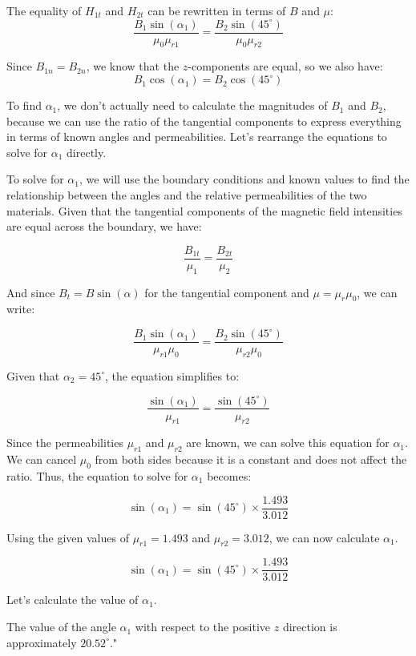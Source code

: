 The equality of \(H_{1t}\) and \(H_{2t}\) can be rewritten in terms of \(B\) and \(\mu\):
\[\frac{B_{1} \sin(\alpha_{1})}{\mu_{0}\mu_{r1}} = \frac{B_{2} \sin(45^\circ)}{\mu_{0}\mu_{r2}}\]

Since \(B_{1n} = B_{2n}\), we know that the \(z\)-components are equal, so we also have:
\[B_{1} \cos(\alpha_{1}) = B_{2} \cos(45^\circ)\]

To find \(\alpha_{1}\), we don't actually need to calculate the magnitudes of \(B_1\) and \(B_2\), because we can use the ratio of the tangential components to express everything in terms of known angles and permeabilities. Let's rearrange the equations to solve for \(\alpha_{1}\) directly.

To solve for \(\alpha_{1}\), we will use the boundary conditions and known values to find the relationship between the angles and the relative permeabilities of the two materials. Given that the tangential components of the magnetic field intensities are equal across the boundary, we have:

\[
\frac{B_{1t}}{\mu_{1}} = \frac{B_{2t}}{\mu_{2}}
\]

And since \(B_t = B \sin(\alpha)\) for the tangential component and \(\mu = \mu_r \mu_0\), we can write:

\[
\frac{B_{1} \sin(\alpha_{1})}{\mu_{r1} \mu_0} = \frac{B_{2} \sin(45^\circ)}{\mu_{r2} \mu_0}
\]

Given that \(\alpha_{2} = 45^\circ\), the equation simplifies to:

\[
\frac{\sin(\alpha_{1})}{\mu_{r1}} = \frac{\sin(45^\circ)}{\mu_{r2}}
\]

Since the permeabilities \(\mu_{r1}\) and \(\mu_{r2}\) are known, we can solve this equation for \(\alpha_{1}\). We can cancel \(\mu_0\) from both sides because it is a constant and does not affect the ratio. Thus, the equation to solve for \(\alpha_{1}\) becomes:

\[
\sin(\alpha_{1}) = \sin(45^\circ) \times \frac{1.493}{3.012}
\]

Using the given values of \(\mu_{r1} = 1.493\) and \(\mu_{r2} = 3.012\), we can now calculate \(\alpha_{1}\).

\[
\sin(\alpha_{1}) = \sin(45^\circ) \times \frac{1.493}{3.012}
\]

Let's calculate the value of \(\alpha_{1}\).

The value of the angle \(\alpha_{1}\) with respect to the positive \(z\) direction is approximately \(20.52^\circ\)."



